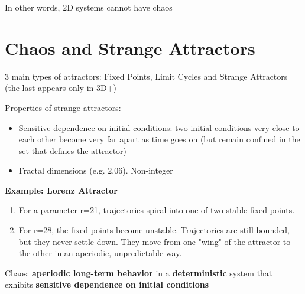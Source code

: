 In other words, 2D systems cannot have chaos

\section*{Chaos and Strange Attractors}

3 main types of attractors: Fixed Points, Limit Cycles and Strange Attractors (the last
appears only in 3D+)

Properties of strange attractors:
\begin{itemize}
  \item Sensitive dependence on initial conditions: two initial conditions very
  close to each other become very far apart as time goes on (but remain confined in the set
  that defines the attractor)
  \item Fractal dimensions (e.g. $2.06$). Non-integer
\end{itemize}

\textbf{Example: Lorenz Attractor}
\begin{enumerate}
  \item For a parameter r=21, trajectories spiral into one of two stable fixed points.
  \item For r=28, the fixed points become unstable. Trajectories are still
  bounded, but they never settle down. They move from one "wing" of the
  attractor to the other in an aperiodic, unpredictable way.
\end{enumerate}

\begin{definition}
Chaos: \textbf{aperiodic long-term behavior} in a \textbf{deterministic} system that exhibits
\textbf{sensitive dependence on initial conditions}
\end{definition}

